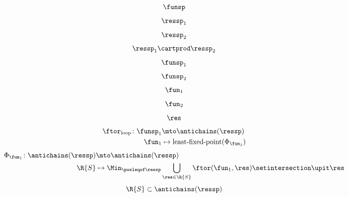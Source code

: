 {\begin{forslides}
\begin{equation*}
			\label{eq:genfun_2}
			\funsp
		\end{equation*}
		\begin{equation*}
			\label{eq:genfun_3}
			\ressp_1
		\end{equation*}
		\begin{equation*}
			\label{eq:genfun_3_1}
			\ressp_2
		\end{equation*}
		\begin{equation*}
			\label{eq:genfun_3_2}
			\ressp_1\cartprod \ressp_2
		\end{equation*}
		\begin{equation*}
			\label{eq:genfun_4}
			\funsp_1
		\end{equation*}
		\begin{equation*}
			\label{eq:genfun_5}
			\funsp_2
		\end{equation*}
		\begin{equation*}
			\label{eq:genfun_6}
			\fun_1
		\end{equation*}
		\begin{equation*}
			\label{eq:genfun_7}
			\fun_2
		\end{equation*}
		\begin{equation*}
			\label{eq:genfun_8}
			\res
		\end{equation*}
		\begin{equation*}
			\label{eq:genfun_9}
			\begin{aligned}
				\ftor_\mathrm{loop}\colon \funsp_1 & \mto \antichains(\ressp)                        \\
				\fun_1                             & \mapsto \text{least-fixed-point}(\Phi_{\fun_1})
			\end{aligned}
		\end{equation*}
		\begin{equation*}
			\label{eq:genfun_10}
			\begin{aligned}
				\Phi_{\fun_1}\colon \antichains(\ressp) & \mto \antichains(\ressp)                                                                             \\
				\R{S}                                   & \mapsto \Min_{\posleqof\ressp} \bigcup_{\res \in \R{S}}\ftor(\fun_1,\res)\setintersection \upit \res
			\end{aligned}
		\end{equation*}
		\begin{equation*}
			\label{eq:genfun_11}
			\R{S}\subset \antichains(\ressp)
		\end{equation*}
		\begin{equation*}

\end{equation*}
\end{forslides}}
